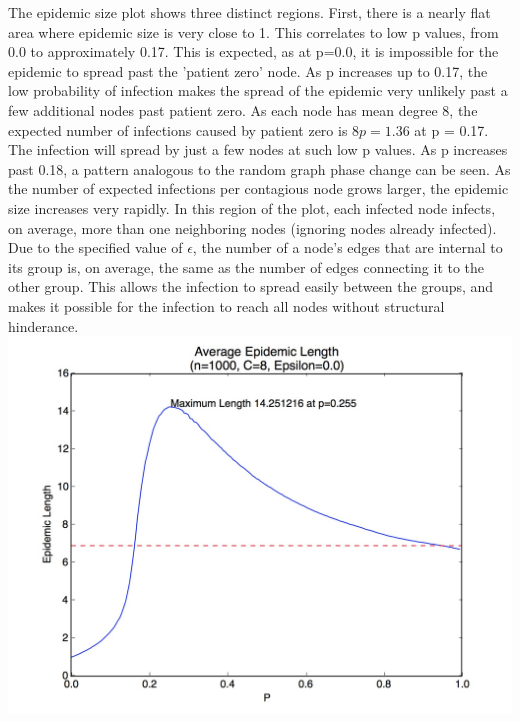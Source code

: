 \documentclass[11pt, oneside]{article}   	%
\begin{document}
\indent The epidemic size plot shows three distinct regions.  First, there is a nearly flat area where epidemic size is very close to 1.  This correlates to low p values, from 0.0 to approximately 0.17.  This is expected, as at p=0.0, it is impossible for the epidemic to spread past the 'patient zero' node.  As p increases up to 0.17, the low probability of infection makes the spread of the epidemic very unlikely past a few additional nodes past patient zero.  As each node has mean degree 8, the expected number of infections caused by patient zero is $8p = 1.36$ at p = 0.17.  The infection will spread by just a few nodes at such low p values.  As p increases past 0.18, a pattern analogous to the random graph phase change can be seen.  As the number of expected infections per contagious node grows larger, the epidemic size increases very rapidly.  In this region of the plot, each infected node infects, on average, more than one neighboring nodes (ignoring nodes already infected).  Due to the specified value of $\epsilon$, the number of a node's edges that are internal to its group is, on average, the same as the number of edges connecting it to the other group.  This allows the infection to spread easily between the groups, and makes it possible for the infection to reach all nodes without structural hinderance.\\
\includegraphics[scale=0.23]{length}\\
\end{document}
